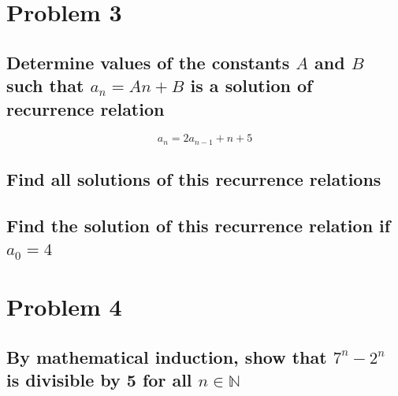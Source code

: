\documentclass[12pt, a4paper]{extarticle}
\begin{document}
\section{Problem 3}
\subsection{Determine values of the constants $A$ and $B$ such that $a_n = An+B$ is a solution of recurrence relation}
\[
  a_n = 2a_{n-1} + n + 5
\]

\subsection{Find all solutions of this recurrence relations}
\subsection{Find the solution of this recurrence relation if $a_0 = 4$}

\section{Problem 4}

\subsection*{By mathematical induction, show that $7^n - 2^n$ is divisible by 5 for all $n \in \mathbb{N}$}
\end{document}

